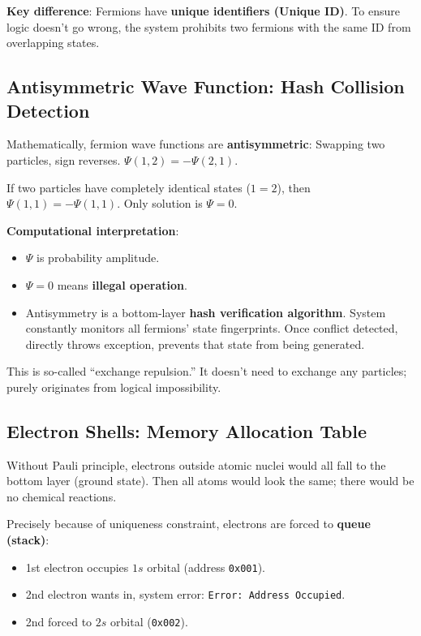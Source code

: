 \textbf{Key difference}:
Fermions have \textbf{unique identifiers (Unique ID)}. To ensure logic doesn't go wrong, the system prohibits two fermions with the same ID from overlapping states.

\subsection{Antisymmetric Wave Function: Hash Collision Detection}

Mathematically, fermion wave functions are \textbf{antisymmetric}:
Swapping two particles, sign reverses. $\Psi(1, 2) = -\Psi(2, 1)$.

If two particles have completely identical states ($1=2$), then $\Psi(1, 1) = -\Psi(1, 1)$.
Only solution is $\Psi = 0$.

\textbf{Computational interpretation}:
\begin{itemize}
\item $\Psi$ is probability amplitude.
\item $\Psi = 0$ means \textbf{illegal operation}.
\item Antisymmetry is a bottom-layer \textbf{hash verification algorithm}. System constantly monitors all fermions' state fingerprints. Once conflict detected, directly throws exception, prevents that state from being generated.
\end{itemize}

This is so-called ``exchange repulsion.'' It doesn't need to exchange any particles; purely originates from logical impossibility.

\subsection{Electron Shells: Memory Allocation Table}

Without Pauli principle, electrons outside atomic nuclei would all fall to the bottom layer (ground state). Then all atoms would look the same; there would be no chemical reactions.

Precisely because of uniqueness constraint, electrons are forced to \textbf{queue (stack)}:
\begin{itemize}
\item 1st electron occupies $1s$ orbital (address \texttt{0x001}).
\item 2nd electron wants in, system error: \texttt{Error: Address Occupied}.
\item 2nd forced to $2s$ orbital (\texttt{0x002}).
\end{itemize}

